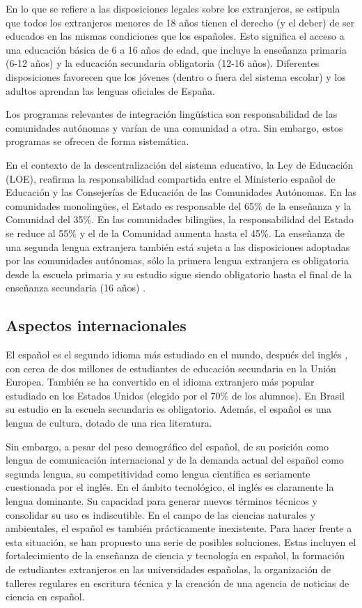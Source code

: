 \begin{multicols}{2}
En lo que se refiere a las disposiciones legales sobre los extranjeros, se estipula que todos los extranjeros menores de 18 años tienen el derecho (y el deber) de ser educados en las mismas condiciones que los españoles. Esto significa el acceso a una educación básica de 6 a 16 años de edad, que incluye la enseñanza primaria (6-12 años) y la educación secundaria obligatoria (12-16 años). Diferentes disposiciones favorecen que los jóvenes (dentro o fuera del sistema escolar) y los adultos aprendan las lenguas oficiales de España.
\columnbreak

Los programas relevantes de integración lingüística son responsabilidad de las comunidades autónomas y varían de una comunidad a otra. Sin embargo, estos programas se ofrecen de forma sistemática.

En el contexto de la descentralización del sistema educativo, la Ley de Educación (LOE), reafirma la responsabilidad compartida entre el Ministerio español de Educación y las Consejerías de Educación de las Comunidades Autónomas. En las comunidades monolingües, el Estado es responsable del 65\% de la enseñanza y la Comunidad del 35\%. En las comunidades bilingües, la responsabilidad del Estado se reduce al 55\% y el de la Comunidad aumenta hasta el 45\%. La enseñanza de una segunda lengua extranjera también está sujeta a las disposiciones adoptadas por las comunidades autónomas, sólo la primera lengua extranjera es obligatoria desde la escuela primaria y su estudio sigue siendo obligatorio hasta el final de la enseñanza secundaria (16 años) \cite{Efni1}.

\subsection{Aspectos internacionales}

El español es el segundo idioma más estudiado en el mundo, después del inglés \cite{conespanola}, con cerca de dos millones de estudiantes de educación secundaria en la Unión Europea. También se ha convertido en el idioma extranjero más popular estudiado en los Estados Unidos (elegido por el 70\% de los alumnos). En Brasil su estudio en la escuela secundaria es obligatorio. Además, el español es una lengua de cultura, dotado de una rica literatura.

Sin embargo, a pesar del peso demográfico del español, de su posición como lengua de comunicación internacional y de la demanda actual del español como segunda lengua, su competitividad como lengua científica es seriamente cuestionada por el inglés. En el ámbito tecnológico, el inglés es claramente la lengua dominante. Su capacidad para generar nuevos términos técnicos y consolidar su uso es indiscutible. En el campo de las ciencias naturales y ambientales, el español es también prácticamente inexistente. Para hacer frente a esta situación, se han propuesto una serie de posibles soluciones. Estas incluyen el fortalecimiento de la enseñanza de ciencia y tecnología en español, la formación de estudiantes extranjeros en las universidades españolas, la organización de talleres regulares en escritura técnica y la creación de una agencia de noticias de ciencia en español.


\end{multicols}
